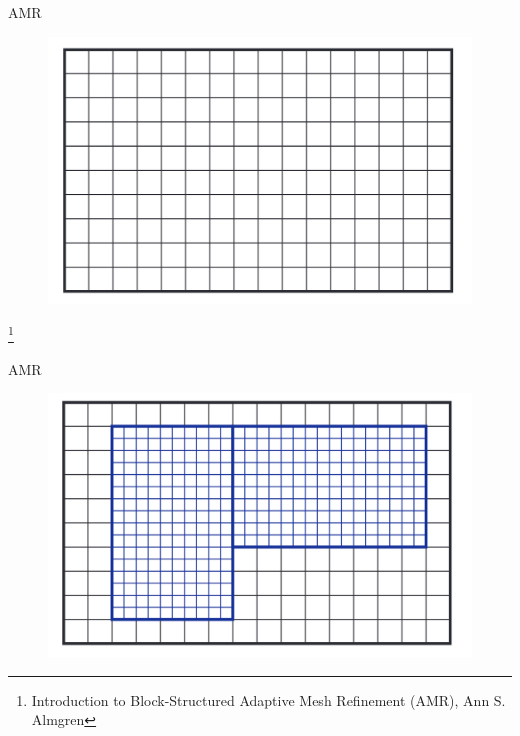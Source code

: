 \documentclass{beamer}
\begin{document}
\begin{frame}{AMR}
    \begin{figure}
        \center
        \includegraphics[scale=0.4]{amr1.png}
    \end{figure}
    \footnote{Introduction to Block-Structured Adaptive Mesh Refinement (AMR), Ann S. Almgren}
\end{frame}

\begin{frame}{AMR}
    \begin{figure}
        \center
        \includegraphics[scale=0.4]{amr2.png}
    \end{figure}
\end{frame}
\end{document}
